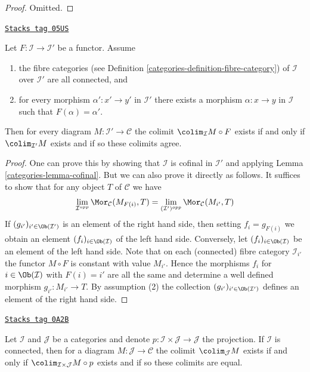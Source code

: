 \begin{proof}
Omitted.
\end{proof}

\begin{lemma}
\label{categories-lemma-colimit-constant-connected-fibers}
\href{https://stacks.math.columbia.edu/tag/05US}{\texttt{Stacks tag 05US}}

Let $F : \mathcal{I} \to \mathcal{I}'$ be a functor.
Assume
\begin{enumerate}
\item the fibre categories (see
Definition \ref{categories-definition-fibre-category})
of $\mathcal{I}$ over $\mathcal{I}'$ are all connected, and
\item for every morphism $\alpha' : x' \to y'$ in $\mathcal{I}'$ there
exists a morphism $\alpha : x \to y$ in $\mathcal{I}$ such that
$F(\alpha) = \alpha'$.
\end{enumerate}
Then for every diagram $M : \mathcal{I}' \to \mathcal{C}$
the colimit $\colim_\mathcal{I} M \circ F$ exists if and only
if $\colim_{\mathcal{I}'} M$ exists and if so these colimits
agree.
\end{lemma}

\begin{proof}

One can prove this by showing that $\mathcal{I}$ is cofinal in
$\mathcal{I}'$ and applying Lemma \ref{categories-lemma-cofinal}.
But we can also prove it directly as follows.
It suffices to show that for any object $T$ of $\mathcal{C}$ we have
$$
\lim_{\mathcal{I}^{opp}} \Mor_\mathcal{C}(M_{F(i)}, T)
=
\lim_{(\mathcal{I}')^{opp}} \Mor_\mathcal{C}(M_{i'}, T)
$$
If $(g_{i'})_{i' \in \Ob(\mathcal{I}')}$ is an element of
the right hand side, then setting $f_i = g_{F(i)}$ we obtain an
element $(f_i)_{i \in \Ob(\mathcal{I})}$ of the left hand side.
Conversely, let $(f_i)_{i \in \Ob(\mathcal{I})}$ be an element of the
left hand side. Note that on each (connected)
fibre category $\mathcal{I}_{i'}$ the functor $M \circ F$
is constant with value $M_{i'}$. Hence the morphisms
$f_i$ for $i \in \Ob(\mathcal{I})$ with $F(i) = i'$
are all the same and determine a well defined morphism
$g_{i'} : M_{i'} \to T$. By assumption (2) the collection
$(g_{i'})_{i' \in \Ob(\mathcal{I}')}$ defines an element
of the right hand side.
\end{proof}

\begin{lemma}
\label{categories-lemma-product-with-connected}
\href{https://stacks.math.columbia.edu/tag/0A2B}{\texttt{Stacks tag 0A2B}}

Let $\mathcal{I}$ and $\mathcal{J}$ be a categories and denote
$p : \mathcal{I} \times \mathcal{J} \to \mathcal{J}$ the projection.
If $\mathcal{I}$ is connected, then for a diagram
$M : \mathcal{J} \to \mathcal{C}$ the colimit $\colim_\mathcal{J} M$ exists
if and only if $\colim_{\mathcal{I} \times \mathcal{J}} M \circ p$ exists and
if so these colimits are equal.
\end{lemma}


